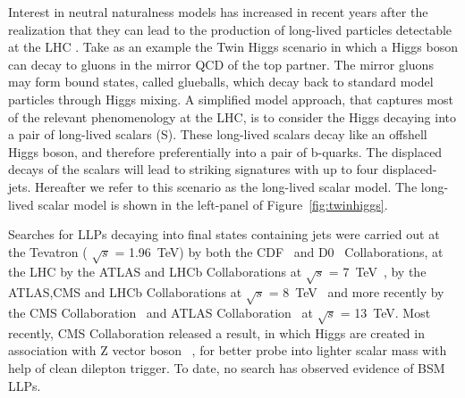 Interest in neutral naturalness models has increased in recent years
after the realization that they can lead to the production of long-lived particles
detectable at the LHC \cite{Craig:2015pha,Curtin:2015fna,Csaki:2015fba}.
Take as an example the Twin Higgs scenario
in which a Higgs boson can decay to gluons in the mirror QCD of the top partner.
The mirror gluons may form bound states, called glueballs, which decay back to
standard model particles through Higgs mixing.
A simplified model approach, that captures most of the relevant phenomenology at the LHC,
 is to consider the Higgs decaying into a pair of long-lived scalars (S).
These long-lived scalars decay like an offshell Higgs boson,
and therefore preferentially into a pair of b-quarks.
The displaced decays of the scalars will lead to striking signatures with up to four displaced-jets.
Hereafter we refer to this scenario as the long-lived scalar model.
The long-lived scalar model is shown in the left-panel of Figure~\ref{fig:twinhiggs}.


Searches for LLPs decaying into final states containing jets were carried out
at the Tevatron ( $\sqrt{s}$ = 1.96~TeV) by both the CDF~\cite{Aaltonen:2011rja} and D0~\cite{Abazov:2009ik} Collaborations,
at the LHC by the ATLAS and LHCb Collaborations at $\sqrt{s}$ = 7~TeV~\cite{ATLAS:2012av,Aaij:2014nma},
by the ATLAS,CMS and LHCb Collaborations at $\sqrt{s}$ = 8~TeV~\cite{Aad:2015uaa,Aad:2015rba,PhysRevD.91.012007,Aad:2015asa,Aaij:2017mic,Aaij:2016xmb,Aaij:2015ica} and more recently by the
CMS Collaboration~\cite{Sirunyan:2017jdo,displacedvertices,displacedjets2016,delayedjets,emergingjets,CMS-PAS-EXO-19-021}
 and ATLAS Collaboration~\cite{Aaboud:2018iil,Aaboud:2018jbr,Aaboud:2018arf,Aaboud:2018aqj,Aaboud:2018kbe,Aaboud:2019trc,Aaboud:2019opc,Aad:2019kiz,Aad:2019pfm,Aad:2019tcc,Aad:2019xav,Aad:2019tua} at $\sqrt{s}$ = 13~TeV. 
Most recently, CMS Collaboration released a result, in which Higgs are created in association with Z vector boson ~\cite{ZHAN}, for better probe into lighter scalar mass with help of clean dilepton trigger.
To date, no search has observed evidence of BSM LLPs.

